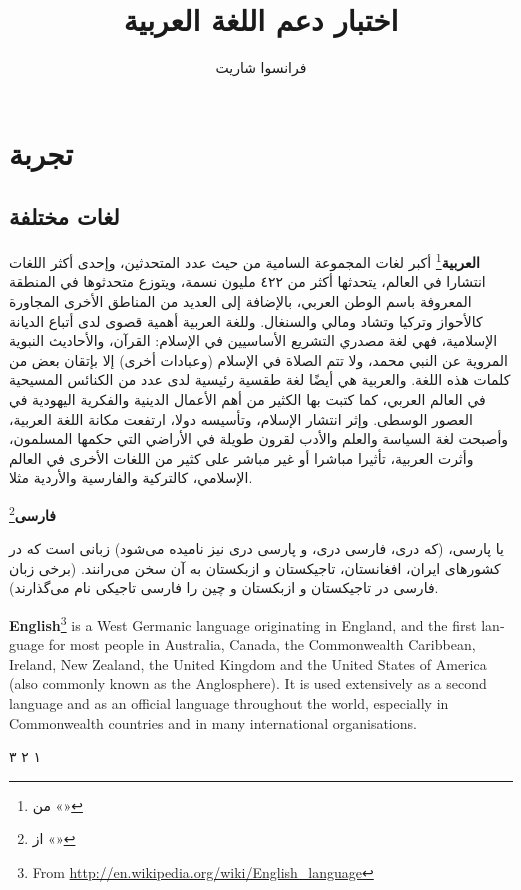 \documentclass[a4paper]{book}%
\title{اختبار دعم اللغة العربية}
\author{فرانسوا شاريت}
\begin{document}
\maketitle
\tableofcontents
\chapter{تجربة}
\section{لغات مختلفة}

\textbf{العربية}\footnote{%
من «»} 
أكبر لغات المجموعة السامية من حيث عدد المتحدثين، وإحدى أكثر اللغات انتشارا في
العالم، يتحدثها أكثر من ٤٢٢ مليون نسمة، ويتوزع متحدثوها في المنطقة المعروفة
باسم الوطن العربي، بالإضافة إلى العديد من المناطق الأخرى المجاورة كالأحواز وتركيا
وتشاد ومالي والسنغال. وللغة العربية أهمية قصوى لدى أتباع الديانة الإسلامية، فهي
لغة مصدري التشريع الأساسيين في الإسلام: القرآن، والأحاديث النبوية المروية عن النبي
محمد، ولا تتم الصلاة في الإسلام (وعبادات أخرى) إلا بإتقان بعض من كلمات هذه اللغة.
والعربية هي أيضًا لغة طقسية رئيسية لدى عدد من الكنائس المسيحية في العالم العربي،
كما كتبت بها الكثير من أهم الأعمال الدينية والفكرية اليهودية في العصور الوسطى.
وإثر انتشار الإسلام، وتأسيسه دولا، ارتفعت مكانة اللغة العربية، وأصبحت لغة السياسة
والعلم والأدب لقرون طويلة في الأراضي التي حكمها المسلمون، وأثرت العربية، تأثيرا
مباشرا أو غير مباشر على كثير من اللغات الأخرى في العالم الإسلامي، كالتركية
والفارسية والأردية مثلا.

\textfarsi{\bfseries فارسی}\footnote{%
از «»}
\begin{farsi}
یا پارسی، (که دری، فارسی دری، و پارسی دری نیز نامیده می‌شود) زبانی است که
در کشورهای ایران، افغانستان، تاجیکستان و ازبکستان به آن سخن می‌رانند.
(برخی زبان فارسی در تاجیکستان و ازبکستان و چین را فارسی تاجیکی نام
می‌گذارند).  
\end{farsi}

\newpage
\begin{english}
\textbf{English}\footnote{%
	From \url{http://en.wikipedia.org/wiki/English_language}} 
is a West Germanic language originating in England, and the first language for
most people in Australia, Canada, the Commonwealth Caribbean, Ireland, New
Zealand, the United Kingdom and the United States of America (also commonly
known as the Anglosphere). It is used extensively as a second language and as
an official language throughout the world, especially in Commonwealth countries
and in many international organisations.

\textarabic{١ ٢ ٣}

\end{english}
\clearpage
\end{document}
